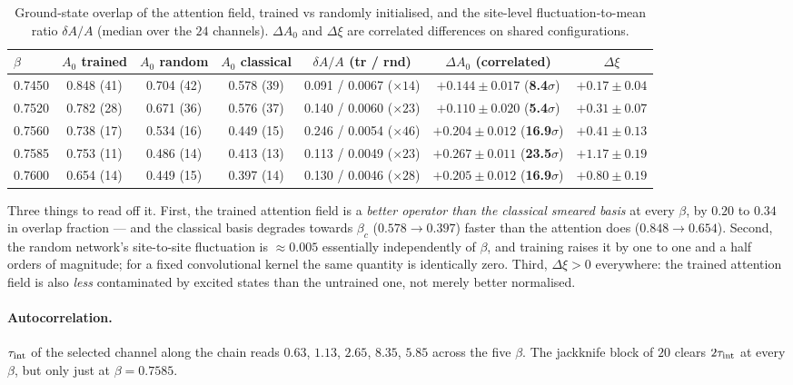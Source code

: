 \documentclass[11pt,a4paper]{article}
\begin{document}
\begin{table}[htbp]
\centering
\caption{Ground-state overlap of the attention field, trained vs randomly
initialised, and the site-level fluctuation-to-mean ratio $\delta A/A$ (median
over the $24$ channels). $\Delta A_0$ and $\Delta\xi$ are correlated
differences on shared configurations.}
\label{tab:learning}
\footnotesize
\setlength{\tabcolsep}{4pt}
\begin{tabular}{@{}lcccccc@{}}
\toprule
$\beta$ & $A_0$ trained & $A_0$ random & $A_0$ classical
        & $\delta A/A$ (tr / rnd) & $\Delta A_0$ (correlated) & $\Delta\xi$ \\
\midrule
0.7450 & 0.848 (41) & 0.704 (42) & 0.578 (39) & 0.091 / 0.0067 ($\times14$) & $+0.144\pm0.017$ (\textbf{8.4$\sigma$})  & $+0.17\pm0.04$ \\
0.7520 & 0.782 (28) & 0.671 (36) & 0.576 (37) & 0.140 / 0.0060 ($\times23$) & $+0.110\pm0.020$ (\textbf{5.4$\sigma$})  & $+0.31\pm0.07$ \\
0.7560 & 0.738 (17) & 0.534 (16) & 0.449 (15) & 0.246 / 0.0054 ($\times46$) & $+0.204\pm0.012$ (\textbf{16.9$\sigma$}) & $+0.41\pm0.13$ \\
0.7585 & 0.753 (11) & 0.486 (14) & 0.413 (13) & 0.113 / 0.0049 ($\times23$) & $+0.267\pm0.011$ (\textbf{23.5$\sigma$}) & $+1.17\pm0.19$ \\
0.7600 & 0.654 (14) & 0.449 (15) & 0.397 (14) & 0.130 / 0.0046 ($\times28$) & $+0.205\pm0.012$ (\textbf{16.9$\sigma$}) & $+0.80\pm0.19$ \\
\bottomrule
\end{tabular}
\end{table}

Three things to read off it. First, the trained attention field is a
\emph{better operator than the classical smeared basis} at every $\beta$, by
$0.20$ to $0.34$ in overlap fraction --- and the classical basis degrades
towards $\beta_c$ ($0.578 \to 0.397$) faster than the attention does
($0.848 \to 0.654$). Second, the random network's site-to-site fluctuation is
$\approx 0.005$ essentially independently of $\beta$, and training raises it by
one to one and a half orders of magnitude; for a fixed convolutional kernel the
same quantity is identically zero. Third, $\Delta\xi > 0$ everywhere: the
trained attention field is also \emph{less} contaminated by excited states than
the untrained one, not merely better normalised.

\paragraph{Autocorrelation.} $\tau_{\rm int}$ of the selected channel along the
chain reads $0.63$, $1.13$, $2.65$, $\mathbf{8.35}$, $5.85$ across the five
$\beta$. The jackknife block of $20$ clears $2\tau_{\rm int}$ at every $\beta$,
but only just at $\beta=0.7585$.
\end{document}
